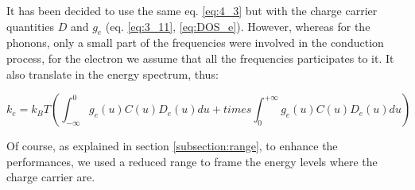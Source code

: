 It has been decided to use the same eq. \ref{eq:4_3} but with the charge carrier quantities $D$ and $g_e$ (eq. \ref{eq:3_11}, \ref{eq:DOS_e}). However, whereas for the phonons, only a small part of the frequencies were involved in the conduction process, for the electron we assume that all the frequencies participates to it. It also translate in the energy spectrum, thus:

\begin{equation}
    k_e = k_BT \left(\int_{-\infty}^{0} g_e(u) C(u)D_e(u)d u + times\int_{0}^{+\infty} g_e(u) C(u)D_e(u)d u\right)
    \label{eq:4_8}
\end{equation}

Of course, as explained in section \ref{subsection:range}, to enhance the performances, we used a reduced range to frame the energy levels where the charge carrier are.